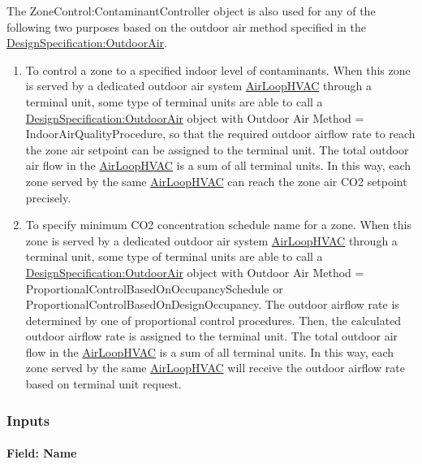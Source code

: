 The ZoneControl:ContaminantController object is also used for any of the following two purposes based on the outdoor air method specified in the \hyperref[designspecificationoutdoorair]{DesignSpecification:OutdoorAir}.

\begin{enumerate}
\def\labelenumi{\arabic{enumi})}
\item
  To control a zone to a specified indoor level of contaminants. When this zone is served by a dedicated outdoor air system \hyperref[airloophvac]{AirLoopHVAC} through a terminal unit, some type of terminal units are able to call a \hyperref[designspecificationoutdoorair]{DesignSpecification:OutdoorAir} object with Outdoor Air Method = IndoorAirQualityProcedure, so that the required outdoor airflow rate to reach the zone air setpoint can be assigned to the terminal unit. The total outdoor air flow in the \hyperref[airloophvac]{AirLoopHVAC} is a sum of all terminal units. In this way, each zone served by the same \hyperref[airloophvac]{AirLoopHVAC} can reach the zone air CO2 setpoint precisely.
\item
  To specify minimum CO2 concentration schedule name for a zone. When this zone is served by a dedicated outdoor air system \hyperref[airloophvac]{AirLoopHVAC} through a terminal unit, some type of terminal units are able to call a \hyperref[designspecificationoutdoorair]{DesignSpecification:OutdoorAir} object with Outdoor Air Method = ProportionalControlBasedOnOccupancySchedule or ProportionalControlBasedOnDesignOccupancy. The outdoor airflow rate is determined by one of proportional control procedures. Then, the calculated outdoor airflow rate is assigned to the terminal unit. The total outdoor air flow in the \hyperref[airloophvac]{AirLoopHVAC} is a sum of all terminal units. In this way, each zone served by the same \hyperref[airloophvac]{AirLoopHVAC} will receive the outdoor airflow rate based on terminal unit request.

\end{enumerate}

\subsubsection{Inputs}\label{inputs-14-017}

\paragraph{Field: Name}\label{field-name-12-013}

